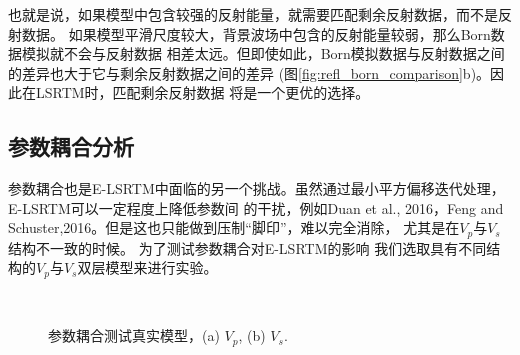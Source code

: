也就是说，如果模型中包含较强的反射能量，就需要匹配剩余反射数据，而不是反射数据。
如果模型平滑尺度较大，背景波场中包含的反射能量较弱，那么Born数据模拟就不会与反射数据
相差太远。但即使如此，Born模拟数据与反射数据之间的差异也大于它与剩余反射数据之间的差异
(图\ref{fig:refl_born_comparison}b)。因此在LSRTM时，匹配剩余反射数据
将是一个更优的选择。
\subsection{参数耦合分析}
参数耦合也是E-LSRTM中面临的另一个挑战。虽然通过最小平方偏移迭代处理，E-LSRTM可以一定程度上降低参数间
的干扰，例如Duan et al., 2016\cite{Duan2016}，Feng and
Schuster,2016\cite{Feng2016}。但是这也只能做到压制“脚印”，难以完全消除，
尤其是在$V_p$与$V_s$结构不一致的时候。%
为了测试参数耦合对E-LSRTM的影响
我们选取具有不同结构的$V_p$与$V_s$双层模型来进行实验。
\begin{figure}[!htb]
   \centering
   \\
   \caption{参数耦合测试真实模型，(a) $V_p$, (b) $V_s$.}
   \label{fig:tradeoffModel}
\end{figure}
